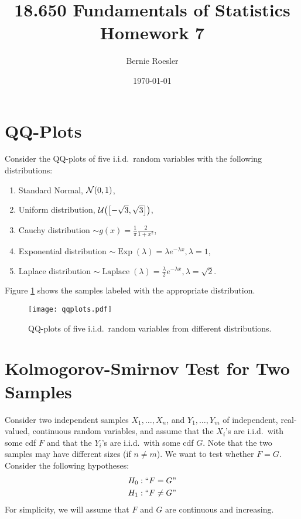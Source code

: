 \documentclass[letterpaper, oneside, reqno]{amsart}
\title[Homework 7 -- Problem \thesection]{18.650 Fundamentals of Statistics\\{\large Homework 7}}
\author{Bernie Roesler}
\date{\today}
\renewcommand{\(}{\mleft(}
\renewcommand{\)}{\mright)}
\renewcommand{\[}{\mleft[}
\renewcommand{\]}{\mright]}
\newcommand{\N}[2]{\mathcal{N}\( #1, #2 \)}
\newcommand{\U}[2]{\mathcal{U}\(\[ #1, #2 \]\)}
\newcommand{\iid}{i.i.d.\ }
\begin{document}

\graphicspath{{./figures/}}

\maketitle

\section{QQ-Plots}
Consider the QQ-plots of five \iid random variables with the following
distributions:
\begin{enumerate}
\item Standard Normal, $\N{0}{1}$,
  \item Uniform distribution, $\U{-\sqrt{3}}{\sqrt{3}}$,
  \item Cauchy distribution $\sim g(x) = \frac{1}{\pi}\frac{2}{1+x^2}$,
  \item Exponential distribution $\sim \operatorname{Exp}(\lambda) = \lambda
    e^{-\lambda x}, \lambda = 1$,
  \item Laplace distribution $\sim \operatorname{Laplace}(\lambda)
    = \frac{\lambda}{2} e^{-\lambda x}, \lambda = \sqrt{2}$.
\end{enumerate}
Figure \ref{fig:qqplots} shows the samples labeled with the appropriate
distribution.

\begin{figure}[!h]
  \centering
  \texttt{[image: qqplots.pdf]}
  \caption{QQ-plots of five \iid random variables from different distributions.}
  \label{fig:qqplots}
\end{figure}

\clearpage
\section{Kolmogorov-Smirnov Test for Two Samples}
Consider two independent samples $X_1, \dots, X_n$, and $Y_1, \dots, Y_m$ of
independent, real-valued, continuous random variables, and assume that the $X_i$'s
are \iid with some cdf $F$ and that the $Y_i$'s are \iid with some cdf $G$. Note that the
two samples may have different sizes (if $n \ne m$). We want to test whether $F = G$.
Consider the following hypotheses:
\begin{align*}
  H_0: ``F = G" \\
  H_1: ``F \ne G"
\end{align*}
For simplicity, we will assume that $F$ and $G$ are continuous and increasing.
\end{document}

